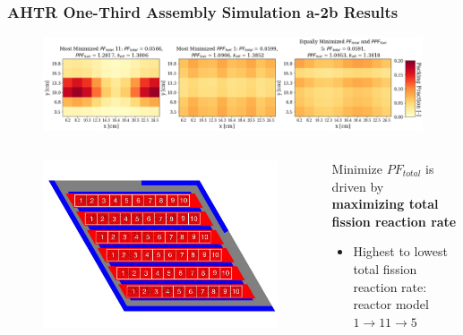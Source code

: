 \begin{frame}
    \frametitle{AHTR One-Third Assembly Simulation a-2b Results}
    \vspace{-0.25cm}
    \begin{figure}
        \centering
        \includegraphics[width=\linewidth]{figures/a-2b-comparison-reactors.png}
    \end{figure}
    \vspace{-0.4cm}
    \begin{columns}
        \begin{column}{0.4\linewidth}
            \begin{figure}
                \centering
                \includegraphics[width=\linewidth]{../docs/figures/ahtr_assembly.png} 
            \end{figure}
        \end{column}
        \begin{column}{0.6\linewidth}
            \small
            Minimize $PF_{total}$ is driven by \textbf{maximizing total fission 
            reaction rate} 
            \begin{itemize}
                \item Highest to lowest total fission reaction rate: reactor model 
                $1 \rightarrow 11 \rightarrow 5$

\end{itemize}
\end{column}
\end{columns}
\end{frame}
